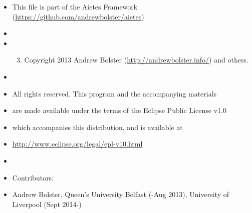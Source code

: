 \documentclass[letterpaper,10pt,english]{sphinxmanual}
\begin{document}
\label{index:module-bounos}\begin{itemize}
\item {} 
This file is part of the Aietes Framework (\href{https://github.com/andrewbolster/aietes}{https://github.com/andrewbolster/aietes})

\item {} 
\item {} \begin{enumerate}
\setcounter{enumi}{2}
\item {} 
Copyright 2013 Andrew Bolster (\href{http://andrewbolster.info/}{http://andrewbolster.info/}) and others.

\end{enumerate}

\item {} 
\item {} 
All rights reserved. This program and the accompanying materials

\item {} 
are made available under the terms of the Eclipse Public License v1.0

\item {} 
which accompanies this distribution, and is available at

\item {} 
\href{http://www.eclipse.org/legal/epl-v10.html}{http://www.eclipse.org/legal/epl-v10.html}

\item {} 
\item {} 
Contributors:

\item {} 
Andrew Bolster, Queen's University Belfast (-Aug 2013), University of Liverpool (Sept 2014-)

\end{itemize}
\end{document}
